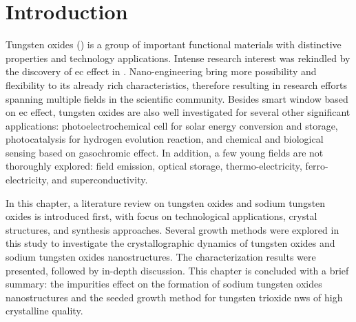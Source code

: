 
\section{Introduction}
Tungsten oxides () is a group of important functional materials with distinctive properties and technology applications. Intense research interest was rekindled by the discovery of \gls{ec} effect in \citeyear{Granqvist1993}.\cite{Granqvist1993}  Nano-engineering  bring more possibility and flexibility to its already rich characteristics, therefore resulting in research efforts spanning multiple fields in the scientific community. Besides smart window based on \gls{ec} effect, tungsten oxides are also well investigated for several other significant applications: photoelectrochemical cell for solar energy conversion and storage, photocatalysis for hydrogen evolution reaction, and chemical and biological sensing based on gasochromic effect. In addition, a few young fields are not thoroughly explored: field emission, optical storage, thermo-electricity, ferro-electricity, and superconductivity.

In this chapter, a literature review on tungsten oxides and sodium tungsten oxides is introduced first, with focus on technological applications, crystal structures, and synthesis approaches. Several growth methods were explored in this study to investigate the crystallographic dynamics of tungsten oxides and sodium tungsten oxides nanostructures. The characterization results were presented, followed by in-depth discussion. This chapter is concluded with a brief summary: the impurities effect on the formation of sodium tungsten oxides nanostructures and the seeded growth method for tungsten trioxide \glspl{nw} of high crystalline quality.

